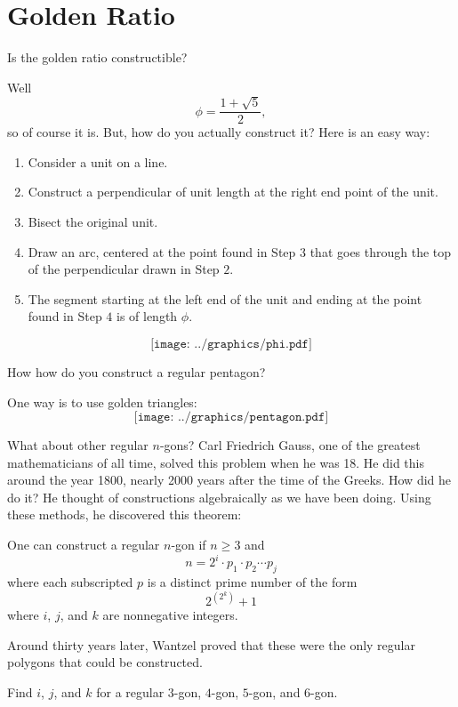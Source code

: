 \newpage
\section{Golden Ratio} %


\begin{question} Is the golden ratio constructible? 
\end{question}
\QM

Well 
\[
\phi =\frac{1 + \sqrt{5}}{2},
\]
so of course it is. But, how do you actually construct it? Here is an easy way:

\begin{construction} \hfill
\begin{enumerate}
\item Consider a unit on a line.
\item Construct a perpendicular of unit length at the right end point of the unit.
\item Bisect the original unit.
\item Draw an arc, centered at the point found in Step $3$ that goes 
through the top of the perpendicular drawn in Step $2$.
\item The segment starting at the left end of the unit and ending at the point found in Step $4$ is of length $\phi$.
\end{enumerate}
\[
\texttt{[image: ../graphics/phi.pdf]}
\]
\end{construction}


\begin{question}How how do you construct a regular pentagon? 
\end{question}
One way is to use golden triangles:
\[
\texttt{[image: ../graphics/pentagon.pdf]}
\]

What about other regular $n$-gons?  Carl
Friedrich Gauss, one of the greatest mathematicians of all time,
solved this problem when he was 18. He did this around the year 1800,
nearly 2000 years after the time of the Greeks.  How did he do it?  He
thought of constructions algebraically as we have been doing. Using
these methods, he discovered this theorem:


\begin{theorem}[Gauss]\label{T:gauss}  One can construct a regular $n$-gon if $n\ge 3$ and 
\[
n= 2^i \cdot p_1\cdot p_2\cdots p_j
\]
where each subscripted $p$ is a distinct prime number of the form
\[
2^{(2^k)}+1
\]
where  $i$, $j$, and $k$ are nonnegative integers.
\end{theorem}

Around thirty years later, Wantzel proved that
these were the only regular polygons that could be constructed.

\begin{question} Find $i$, $j$, and $k$ for a regular $3$-gon, $4$-gon, $5$-gon, and $6$-gon.
\end{question}
\QM
